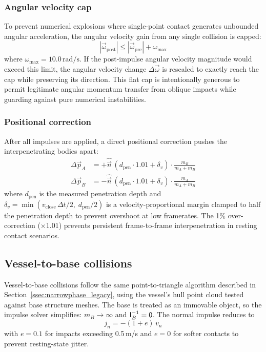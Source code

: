 \documentclass[Orbiter Technical Reference.tex]{subfiles}
\begin{document}
\subsubsection{Angular velocity cap}
\label{sssec:omegacap}
To prevent numerical explosions where single-point contact generates
unbounded angular acceleration, the angular velocity gain from any single
collision is capped:
\begin{equation*}
|\vec{\omega}_{\mathrm{post}}| \le |\vec{\omega}_{\mathrm{pre}}| + \omega_{\max}
\end{equation*}
where $\omega_{\max} = 10.0\,\text{rad/s}$.  If the post-impulse angular
velocity magnitude would exceed this limit, the angular velocity change
$\Delta\vec{\omega}$ is rescaled to exactly reach the cap while preserving
its direction.  This flat cap is intentionally generous to permit
legitimate angular momentum transfer from oblique impacts while guarding
against pure numerical instabilities.

\subsubsection{Positional correction}
After all impulses are applied, a direct positional correction
pushes the interpenetrating bodies apart:
\begin{equation}
\begin{aligned}
\Delta\vec{p}_A &= +\hat{\vec{n}}\,(d_{\mathrm{pen}} \cdot 1.01 + \delta_v) \cdot
                    \frac{m_B}{m_A + m_B} \\[4pt]
\Delta\vec{p}_B &= -\hat{\vec{n}}\,(d_{\mathrm{pen}} \cdot 1.01 + \delta_v) \cdot
                    \frac{m_A}{m_A + m_B}
\end{aligned}
\label{eq:pos_correction}
\end{equation}
where $d_{\mathrm{pen}}$ is the measured penetration depth and
$\delta_v = \min(v_{\mathrm{close}}\,\Delta t / 2,\; d_{\mathrm{pen}} / 2)$
is a velocity-proportional margin clamped to half the penetration depth
to prevent overshoot at low framerates.
The 1\% over-correction ($\times 1.01$) prevents persistent
frame-to-frame interpenetration in resting contact scenarios.


\subsection{Vessel-to-base collisions}
\label{ssec:vessel_base}
Vessel-to-base collisions follow the same point-to-triangle
algorithm described in Section~\ref{ssec:narrowphase_legacy}, using the
vessel's hull point cloud tested against base structure meshes.
The base is treated as an immovable object, so the impulse solver
simplifies: $m_B \to \infty$ and $\mathsf{I}_B^{-1} = \mathsf{0}$.
The normal impulse reduces to
\begin{equation*}
j_n = -(1 + e)\,v_n
\end{equation*}
with $e = 0.1$ for impacts exceeding 0.5\,m/s and $e = 0$ for softer
contacts to prevent resting-state jitter.
\end{document}
